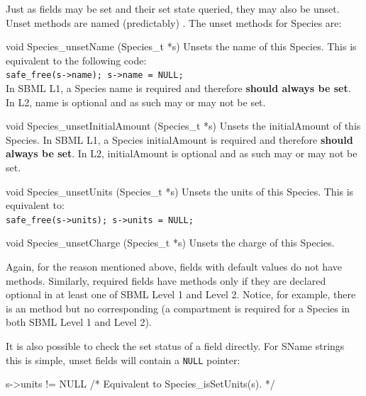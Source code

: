 \documentclass{sbmlmanual}
\begin{document}
Just as fields may be set and their set state queried, they may also
be unset.  Unset methods are named (predictably)
.  The unset methods for Species are:

\begin{methoddef}{void Species\_unsetName (Species\_t *s)}
  Unsets the name of this Species.  This is equivalent to the following code:\\
  \texttt{safe\_free(s->name); s->name = NULL;}
  \\
  In SBML L1, a Species name is required and therefore \textbf{should
  always be set}.  In L2, name is optional and as such may or may not
  be set.
\end{methoddef}

\begin{methoddef}{void Species\_unsetInitialAmount (Species\_t *s)}
  Unsets the initialAmount of this Species.  In SBML L1, a Species
  initialAmount is required and therefore \textbf{should always be
  set}.  In L2, initialAmount is optional and as such may or may not
  be set.
\end{methoddef}

\begin{methoddef}{void Species\_unsetUnits (Species\_t *s)}
  Unsets the units of this Species.  This is equivalent to:\\
  \texttt{safe\_free(s->units); s->units = NULL;}
\end{methoddef}

\begin{methoddef}{void Species\_unsetCharge (Species\_t *s)}
  Unsets the charge of this Species.
\end{methoddef}

Again, for the reason mentioned above, fields with default values do
not have  methods.  Similarly, required fields have
 methods only if they are declared optional in at
least one of SBML Level 1 and Level 2.  Notice, for example, there is
an  method but no corresponding
 (a compartment is required for a Species
in both SBML Level 1 and Level 2).

It is also possible to check the set status of a field directly.  For
SName strings this is simple, unset fields will contain a
\texttt{NULL} pointer:

\begin{example}[c]
  s->units != NULL  /* Equivalent to Species_isSetUnits(s). */
\end{example}
\end{document}
